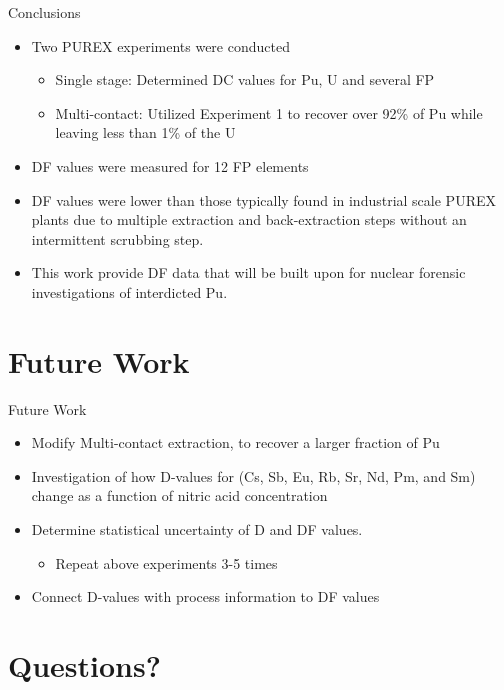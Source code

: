 \documentclass{beamer}
\begin{document}
\begin{frame}{Conclusions}
  \begin{itemize}
  \item{Two PUREX experiments were conducted}
    \begin{itemize}
    \item{Single stage: Determined DC values for Pu, U and several FP}
    \item{Multi-contact: Utilized Experiment 1 to recover over 92\%
      of Pu while leaving less than 1\% of the U}
    \end{itemize}
  \item{DF values were measured for 12 FP elements}
  \item{DF values were lower than those typically found in industrial
    scale PUREX plants due to multiple extraction and back-extraction
    steps without an intermittent scrubbing step.}
  \item{This work provide DF data that will be built upon for
        nuclear forensic investigations of interdicted Pu.}
  \end{itemize}
\end{frame}


\section{Future Work}
\begin{frame}
\sectionpage
\end{frame}

\begin{frame}{Future Work}
  \begin{itemize}
  \item{Modify Multi-contact extraction, to recover a larger
    fraction of Pu}
  \item{Investigation of how D-values for (Cs, Sb,
    Eu, Rb, Sr, Nd, Pm, and Sm) change as a function of
    nitric acid concentration}
  \item{Determine statistical uncertainty of D and DF values.}
    \begin{itemize}
    \item{Repeat above experiments 3-5 times}
    \end{itemize}
  \item{Connect D-values with process information to DF values}
\end{itemize}
\end{frame}

\appendix
\section{Questions?}
\begin{frame}
\sectionpage
\end{frame}
\end{document}
